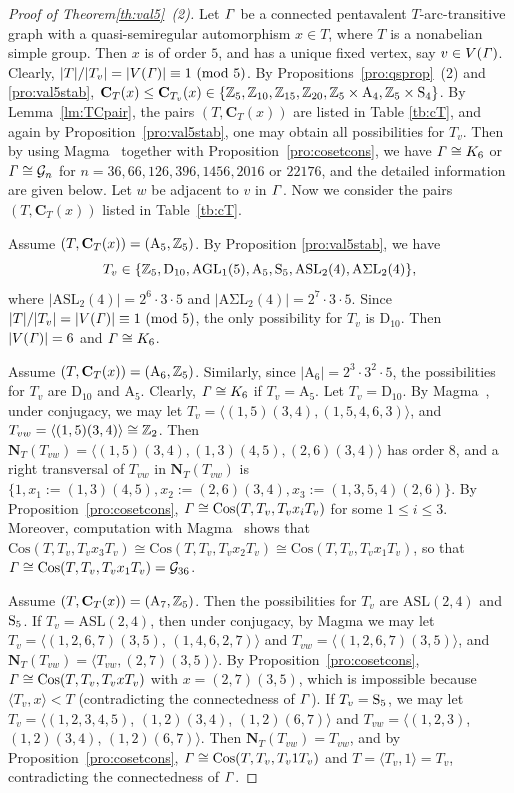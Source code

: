 \documentclass[12pt,reqno]{amsart}
\newcommand\A{\mathrm{A}} \newcommand\AGL{\mathrm{AGL}} \newcommand\AGammaL{\mathrm{A\Gamma L}} \newcommand\Alt{\mathrm{Alt}} \newcommand\ASL{\mathrm{ASL}} \newcommand\ASigmaL{\mathrm{A \Sigma L}} \newcommand\Aut{\mathrm{Aut}}
\def\C{\mathbf{C}}   \newcommand\Cay{\mathrm{Cay}}   \newcommand\Cos{\mathrm{Cos}} \newcommand{\CGammaSp}{\mathrm{C\Gamma Sp}}
\newcommand\D{\mathrm{D}}   \def\det{{\sf det}}
\newcommand\N{\mathbf{N}}
\newcommand{\cG}{\mathcal{G}}
\numberwithin {equation} {section}
\begin{document}
\begin{proof}[Proof of Theorem\ref{th:val5}~{\rm(2)}]  Let ${\it \Gamma}$ be a connected pentavalent $T$-arc-transitive graph with  a quasi-semiregular automorphism $x\in T$, where $T$ is a nonabelian simple group. Then $x$ is of order $5$, and has a unique fixed vertex, say $v\in V({\it \Gamma})$. Clearly, $|T|/|T_v | = |V ({\it \Gamma})|  \equiv 1 \ ({\rm mod~} 5)$. By Propositions~\ref{pro:qsprop}~(2) and  \ref{pro:val5stab}, $\C_T (x) \leq \C_{T_v} (x)\in \{\ZZ_5,\ZZ_{10}, \ZZ_{15}, \ZZ_{20}, \ZZ_5 \times \A_4, \ZZ_5 \times \Sy_4 \}$.  By Lemma~\ref{lm:TCpair}, the pairs $(T,\C_T(x))$ are listed in Table \ref{tb:cT}, and again by Proposition~\ref{pro:val5stab}, one may obtain all possibilities for $T_v$. Then by using {\sc Magma}~\cite{Magma} together with Proposition~\ref{pro:cosetcons}, we have ${\it \Gamma}\cong K_6$ or $\Ga\cong\cG_n$ for $n=36,66,126,396,1456,2016$ or $22176$, and the detailed information are given below. Let $w$ be adjacent to $v$ in ${\it \Gamma}$. Now we consider the pairs $(T,\C_T(x))$ listed in Table~\ref{tb:cT}.

Assume $(T,\C_T(x))=(\A_5,\ZZ_5)$. By Proposition \ref{pro:val5stab}, we have \[T_v \in \{ \ZZ_5,\D_{10},\AGL_1(5),\A_5, \Sy_5, \ASL_2(4), \ASigmaL_2(4)\},\]
where $|\ASL_2(4)|=2^6{\cdot}3{\cdot}5$ and $|\ASigmaL_2(4)|=2^7{\cdot}3{\cdot} 5$. Since $|T|/|T_v| = |V ({\it \Gamma})|  \equiv 1 \ ({\rm mod~} 5)$, the only possibility for $ T_v $ is $ \D_{10}$. Then $|V({\it \Gamma})|=6$ and ${\it \Gamma}\cong K_6$.

Assume $(T,\C_T(x))=(\A_6,\ZZ_5)$. Similarly, since $|\A_6|=2^3{\cdot}3^2{\cdot}5$, the possibilities for  $ T_v $ are $ \D_{10}$  and $ \A_{5}$. Clearly, ${\it \Gamma}\cong K_6$ if $T_v=\A_5$. Let $T_v=\D_{10}$. By {\sc Magma}~\cite{Magma}, under conjugacy, we may let $T_v=\langle (1,5)(3,4),(1,5,4,6,3)\rangle$, and $T_{vw}=\langle (1,5)(3,4) \rangle\cong \mathbb{Z}_2$. Then $\N_T(T_{vw})=\langle (1,5)(3,4),(1,3)(4,5),(2,6)(3,4)\rangle$ has order $8$, and a right transversal of $T_{vw} $ in $\N_T(T_{vw})$ is $\{1,x_1:=(1,3)(4,5),x_2:=(2,6)(3,4),x_3:=(1, 3, 5, 4)(2, 6) \}$. By Proposition~\ref{pro:cosetcons}, $\Ga \cong \Cos(T,T_v,T_vx_iT_v)$ for some $1\leq i \leq 3$. Moreover,  computation with {\sc Magma}~\cite{Magma} shows that $\Cos(T,T_v,T_vx_3T_v)\cong \Cos(T,T_v,T_vx_2T_v)\cong\Cos(T,T_v,T_vx_1T_v)$, so that $\Ga\cong\Cos(T,T_v,T_vx_1T_v)=\cG_{36}$.


Assume $(T,\C_T(x))=(\A_7,\ZZ_5)$. Then the possibilities for  $ T_v $ are $ \ASL(2,4)$  and $ \mathrm{S}_{5} $. If $T_v=\ASL(2,4)$, then under conjugacy, by {\sc Magma} we may let $T_v=\langle (1, 2, 6, 7)(3, 5)$, $(1, 4, 6, 2, 7)\rangle$ and $T_{vw}=\langle (1, 2, 6, 7)(3, 5)\rangle$, and $\N_T(T_{vw})=\langle T_{vw}, (2, 7)(3, 5)\rangle$. By Proposition~\ref{pro:cosetcons}, $\Ga \cong \Cos(T,T_v,T_v x T_v)$ with $x=(2, 7)(3, 5)$, which is impossible because $\langle T_v, x\rangle<T$ (contradicting the connectedness of ${\it \Gamma}$). If $T_v=\mathrm{S}_5$, we may let $T_v=\langle (1,2,3,4,5)$, $(1,2)(3,4)$, $(1,2)(6,7) \rangle $ and $T_{vw}=\langle (1,2,3)$, $(1,2)(3,4)$, $(1,2)(6,7)\rangle$. Then $\N_T(T_{vw})= T_{vw}$, and by Proposition~\ref{pro:cosetcons}, $\Ga \cong \Cos(T,T_v,T_v 1 T_v)$ and $T=\langle T_v,1\rangle=T_v$, contradicting the connectedness of ${\it \Gamma}$.


\end{proof}
\end{document}
